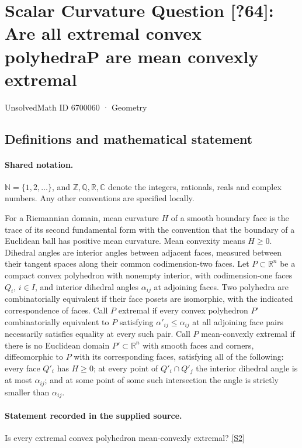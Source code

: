 \documentclass[11pt]{article}
\newcommand{\sref}[2]{\hyperlink{source:#1:#2}{[S#2]}}
\begin{document}
\setcounter{section}{6700059}
\section{Scalar Curvature Question [?64]: Are all extremal convex polyhedraP are mean convexly extremal}\label{6700060}
{\small\sffamily UnsolvedMath ID 6700060 · Geometry}
\subsection{Definitions and mathematical statement}

\paragraph{Shared notation.}$\mathbb N=\{1,2,\ldots\}$, and $\mathbb Z,\mathbb Q,\mathbb R,\mathbb C$ denote the integers, rationals, reals and complex numbers. Any other conventions are specified locally.


For a Riemannian domain, mean curvature $H$ of a smooth boundary face is the trace of its second fundamental form with the convention that the boundary of a Euclidean ball has positive mean curvature. Mean convexity means $H\geq0$. Dihedral angles are interior angles between adjacent faces, measured between their tangent spaces along their common codimension-two faces.
Let $P\subset\mathbb R^n$ be a compact convex polyhedron with nonempty interior, with codimension-one faces $Q_i$, $i\in I$, and interior dihedral angles $\alpha_{ij}$ at adjoining faces. Two polyhedra are combinatorially equivalent if their face posets are isomorphic, with the indicated correspondence of faces. Call $P$ extremal if every convex polyhedron $P'$ combinatorially equivalent to $P$ satisfying $\alpha'_{ij}\leq\alpha_{ij}$ at all adjoining face pairs necessarily satisfies equality at every such pair.
Call $P$ mean-convexly extremal if there is no Euclidean domain $P'\subset\mathbb R^n$ with smooth faces and corners, diffeomorphic to $P$ with its corresponding faces, satisfying all of the following: every face $Q'_i$ has $H\geq0$; at every point of $Q'_i\cap Q'_j$ the interior dihedral angle is at most $\alpha_{ij}$; and at some point of some such intersection the angle is strictly smaller than $\alpha_{ij}$.
\paragraph{Statement recorded in the supplied source.}
Is every extremal convex polyhedron mean-convexly extremal? \sref{6700060}{2}
\end{document}
